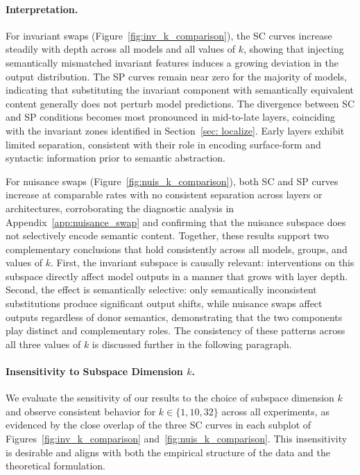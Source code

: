 \paragraph{Interpretation.}
For invariant swaps (Figure~\ref{fig:inv_k_comparison}), the SC curves increase steadily with depth across all models and all values of $k$, showing that injecting semantically mismatched invariant features induces a growing deviation in the output distribution. The SP curves remain near zero for the majority of models, indicating that substituting the invariant component with semantically equivalent content generally does not perturb model predictions. The divergence between SC and SP conditions becomes most pronounced in mid-to-late layers, coinciding with the invariant zones identified in Section~\ref{sec: localize}. Early layers exhibit limited separation, consistent with their role in encoding surface-form and syntactic information prior to semantic abstraction.

For nuisance swaps (Figure~\ref{fig:nuis_k_comparison}), both SC and SP curves increase at comparable rates with no consistent separation across layers or architectures, corroborating the diagnostic analysis in Appendix~\ref{app:nuisance_swap} and confirming that the nuisance subspace does not selectively encode semantic content. Together, these results support two complementary conclusions that hold consistently across all models, groups, and values of $k$. First, the invariant subspace is causally relevant: interventions on this subspace directly affect model outputs in a manner that grows with layer depth. Second, the effect is semantically selective: only semantically inconsistent substitutions produce significant output shifts, while nuisance swaps affect outputs regardless of donor semantics, demonstrating that the two components play distinct and complementary roles. The consistency of these patterns across all three values of $k$ is discussed further in the following paragraph.



\paragraph{Insensitivity to Subspace Dimension $k$.}
We evaluate the sensitivity of our results to the choice of subspace dimension $k$ and observe consistent behavior for $k \in \{1, 10, 32\}$ across all experiments, as evidenced by the close overlap of the three SC curves in each subplot of Figures~\ref{fig:inv_k_comparison} and~\ref{fig:nuis_k_comparison}. This insensitivity is desirable and aligns with both the empirical structure of the data and the theoretical formulation.

